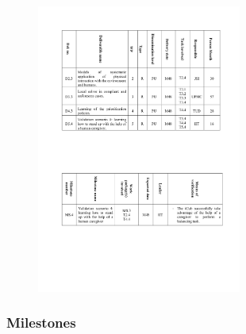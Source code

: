 \documentclass[12pt,a4paper,twoside]{article}
\begin{document}
\begin{figure}
\centering
\includegraphics[width=0.6\textwidth]{./images/deliverables.pdf}
\end{figure}

\subsubsection{Milestones}
\end{document}
